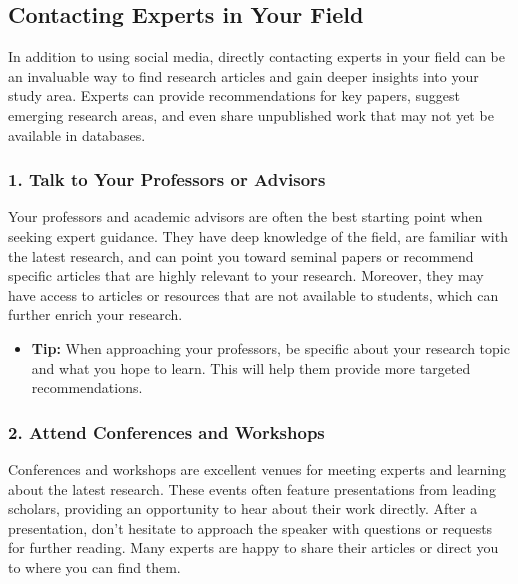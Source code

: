 \documentclass[
]{book}
\providecommand{\tightlist}{%
  \setlength{\itemsep}{0pt}\setlength{\parskip}{0pt}}
\begin{document}
\subsection*{Contacting Experts in Your Field}\label{contacting-experts-in-your-field}

In addition to using social media, directly contacting experts in your field can be an invaluable way to find research articles and gain deeper insights into your study area. Experts can provide recommendations for key papers, suggest emerging research areas, and even share unpublished work that may not yet be available in databases.

\subsubsection*{1. Talk to Your Professors or Advisors}\label{talk-to-your-professors-or-advisors}

Your professors and academic advisors are often the best starting point when seeking expert guidance. They have deep knowledge of the field, are familiar with the latest research, and can point you toward seminal papers or recommend specific articles that are highly relevant to your research. Moreover, they may have access to articles or resources that are not available to students, which can further enrich your research.

\begin{itemize}
\tightlist
\item
  \textbf{Tip:} When approaching your professors, be specific about your research topic and what you hope to learn. This will help them provide more targeted recommendations.
\end{itemize}

\subsubsection*{2. Attend Conferences and Workshops}\label{attend-conferences-and-workshops}

Conferences and workshops are excellent venues for meeting experts and learning about the latest research. These events often feature presentations from leading scholars, providing an opportunity to hear about their work directly. After a presentation, don't hesitate to approach the speaker with questions or requests for further reading. Many experts are happy to share their articles or direct you to where you can find them.
\end{document}

